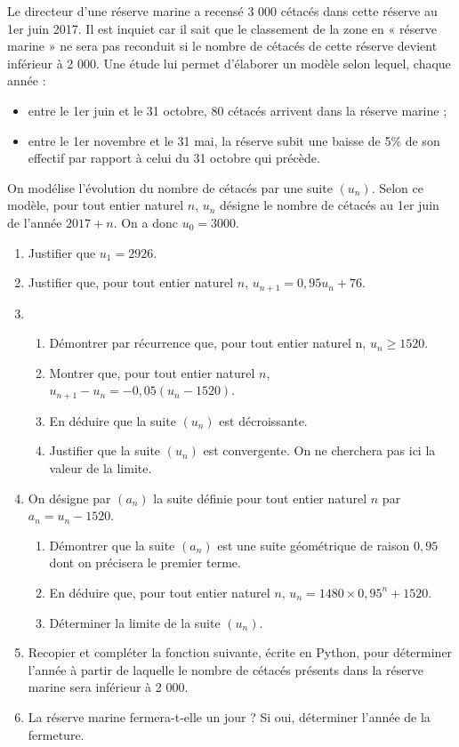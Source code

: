 \documentclass[11pt,fleqn, openany]{book} %
\begin{document}
\begin{exercise}[subtitle={(Antilles-Guyane 2018)}]

Le directeur d'une réserve marine a recensé 3 000 cétacés dans cette réserve au 1er juin 2017. Il est inquiet car il sait que le classement de la zone en « réserve marine » ne sera pas reconduit si le nombre de cétacés de cette réserve devient inférieur à 2 000.
Une étude lui permet d'élaborer un modèle selon lequel, chaque année :
\begin{itemize}
\item entre le 1er juin et le 31 octobre, 80 cétacés arrivent dans la réserve marine ;
\item entre le 1er novembre et le 31 mai, la réserve subit une baisse de 5\% de son effectif par
rapport à celui du 31 octobre qui précède.\end{itemize}
On modélise l'évolution du nombre de cétacés par une suite $(u_n)$. Selon ce modèle, pour tout
entier naturel $n$, $u_n$ désigne le nombre de cétacés au 1er juin de l’année $2017 + n$. On a donc
$u_0 = 3000$.
\begin{enumerate}
\item Justifier que $u_1 = 2926$.
\item Justifier que, pour tout entier naturel $n$, $u_{n+1} = 0,95u_n +76$.
\item \begin{enumerate}
\item Démontrer par récurrence que, pour tout entier naturel n, $u_n \geqslant 1520$.
\item Montrer que, pour tout entier naturel $n$, $u_{n+1}-u_n = -0,05(u_n -1520)$.
\item En déduire que la suite $(u_n)$ est décroissante.
\item Justifier que la suite $(u_n)$ est convergente. On ne cherchera pas ici la valeur de la limite.\end{enumerate}
\item On désigne par $(a_n)$ la suite définie pour tout entier naturel $n$ par $a_n = u_n -1520$.
\begin{enumerate}
\item Démontrer que la suite $(a_n)$ est une suite géométrique de raison $0,95$ dont on précisera le premier terme.
\item En déduire que, pour tout entier naturel $n$, $u_n = 1480 \times 0,95^n +1520$.
\item Déterminer la limite de la suite $(u_n)$.\end{enumerate}
\item Recopier et compléter la fonction suivante, écrite en Python, pour déterminer l'année à partir de laquelle le
nombre de cétacés présents dans la réserve marine sera inférieur à 2 000.



\item La réserve marine fermera-t-elle un jour ? Si oui, déterminer l'année de la fermeture.\end{enumerate}
\newpage
\end{exercise}
\end{document}
